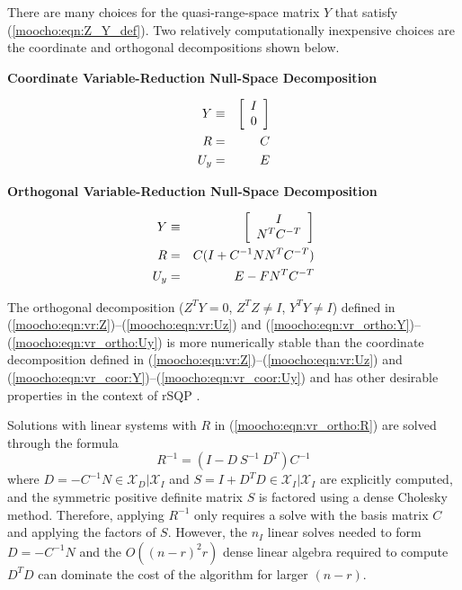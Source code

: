 \documentclass[pdf,ps2pdf,11pt]{SANDreport}
\begin{document}
{{There are many choices for the quasi-range-space matrix $Y$ that
satisfy (\ref{moocho:eqn:Z_Y_def}).  Two relatively computationally
inexpensive choices are the coordinate and orthogonal decompositions
shown below.

{\bsinglespace
\begin{center}\textbf{Coordinate Variable-Reduction Null-Space Decomposition}\end{center}
\begin{eqnarray}
Y & \equiv & {\bmat{c} I \\ 0 \emat}    \label{moocho:eqn:vr_coor:Y} \\
R & = & C                               \label{moocho:eqn:vr_coor:R} \\
U_y & = & E                             \label{moocho:eqn:vr_coor:Uy}
\end{eqnarray}

\begin{center}\textbf{Orthogonal Variable-Reduction Null-Space Decomposition}\end{center}
\begin{eqnarray}
Y & \equiv & {\bmat{c} I \\ N^T C^{-T} \emat}       \label{moocho:eqn:vr_ortho:Y} \\
R & = & C (I + C^{-1 }N N^T C^{-T})                 \label{moocho:eqn:vr_ortho:R} \\
U_y & = & E - F N^T C^{-T}                          \label{moocho:eqn:vr_ortho:Uy}
\end{eqnarray}
\esinglespace}

The orthogonal decomposition ($Z^T Y = 0$, $Z^T Z \neq I$, $Y^T Y \neq I$)
defined in (\ref{moocho:eqn:vr:Z})--(\ref{moocho:eqn:vr:Uz}) and
(\ref{moocho:eqn:vr_ortho:Y})--(\ref{moocho:eqn:vr_ortho:Uy}) is more
numerically stable than the coordinate decomposition defined in
(\ref{moocho:eqn:vr:Z})--(\ref{moocho:eqn:vr:Uz}) and
(\ref{moocho:eqn:vr_coor:Y})--(\ref{moocho:eqn:vr_coor:Uy}) and has other
desirable properties in the context of rSQP {}\cite{ref:schmid_accel_1993}.

Solutions with linear systems with $R$ in (\ref{moocho:eqn:vr_ortho:R}) are
solved through the formula
%
\begin{equation}
R^{-1} = ( I - D \: S^{-1} \: D^T ) C^{-1}
\label{moocho:eqn:vr_ortho:R:SMW}
\end{equation}
%
where $D = -C^{-1} N {}\in\mathcal{X}_D|\mathcal{X}_I$ and $S = I + D^T D
{}\in\mathcal{X}_I|\mathcal{X}_I$ are explicitly computed, and the symmetric
positive definite matrix $S$ is factored using a dense Cholesky method.
Therefore, applying $R^{-1}$ only requires a solve with the basis matrix $C$
and applying the factors of $S$.  However, the $n_I$ linear solves needed to
form $D = -C^{-1} N$ and the $O((n-r)^2 r)$ dense linear algebra required to
compute $D^T D$ can dominate the cost of the algorithm for larger $(n-r)$.

}}
\end{document}
